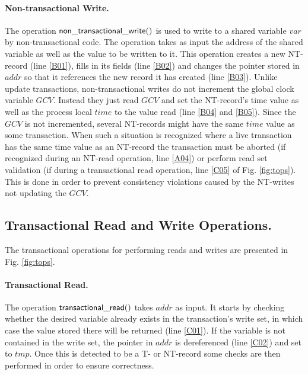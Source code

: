 \paragraph{Non-transactional Write.}
The operation ${\sf non\_transactional\_write()}$ is used to write to 
a shared variable $\mathit{var}$ 
by non-transactional code.
The operation takes as input the address of the shared variable as well as the 
value to be written to it.
This operation  
creates a  new  NT-record  (line  \ref{B01}),  fills  in  its  fields  (line
\ref{B02})  and 
changes the pointer stored in $\mathit{addr}$ so that it references the 
new record it has created  (line \ref{B03}).
Unlike update transactions, non-transactional writes do not increment
the global clock variable $\mathit{GCV}$.
Instead they just read $\mathit{GCV}$ and set the NT-record's time value as well as
the process local $\mathit{time}$ to the value read (line \ref{B04} and \ref{B05}).
Since the $\mathit{GCV}$ is not incremented, several NT-records might have the same
$\mathit{time}$ value as some transaction.
When such a situation is recognized where a live transaction has the same time value
as an NT-record the transaction must be aborted (if recognized during an NT-read operation,
line \ref{A04}) or perform read set validation (if during a transactional
read operation, line \ref{C05} of Fig. \ref{fig:tops}).
This is done in order to prevent consistency violations
caused by the NT-writes not updating the $\mathit{GCV}$. %

\subsection{Transactional Read and Write Operations.}

The transactional operations for performing reads and writes are 
presented in Fig. \ref{fig:tops}. 

\paragraph{Transactional Read.}

The operation ${\sf  transactional\_read()}$ takes $\mathit{addr}$ as
input. It starts by checking  
whether the  desired variable already  exists in the  transaction{}'s write
set, in which  
case  the   value  stored there  will   be  returned  (line
\ref{C01}). If the variable is not contained  
in  the write  set, the  pointer in  $\mathit{addr}$ is  dereferenced (line
\ref{C02}) and set to $\mathit{tmp}$. Once this is detected to be a T- or NT-record
some checks are then performed in order to ensure correctness.

